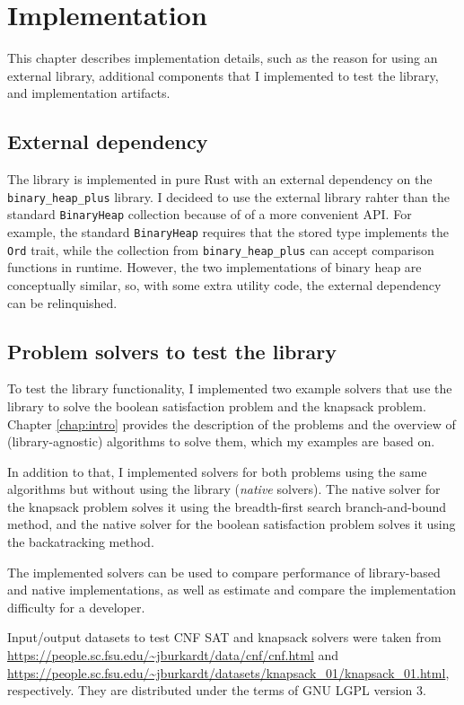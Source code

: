 \chapter{Implementation}
\label{chap:impl}

This chapter describes implementation details, such as the reason for using an external library,
additional components that I implemented to test the library, and implementation artifacts.

\section{External dependency}

The library is implemented in pure Rust with an external dependency on the
\texttt{binary\_heap\_plus} library. I decideed to use the external library rahter than the
standard \texttt{BinaryHeap} collection because of of a more convenient API. For example,
the standard \texttt{BinaryHeap} requires that the stored type implements the \texttt{Ord}
trait, while the collection from \texttt{binary\_heap\_plus} can accept comparison functions in
runtime. However, the two implementations of binary heap are conceptually similar, so, with some
extra utility code, the external dependency can be relinquished.

\section{Problem solvers to test the library}

To test the library functionality, I implemented two example solvers that use the library to
solve the boolean satisfaction problem and the knapsack problem. Chapter \ref{chap:intro}
provides the description of the problems and the overview of (library-agnostic)
algorithms to solve them, which my examples are based on.

In addition to that, I implemented solvers for both problems using the same algorithms
but without using the library (\emph{native} solvers).
The native solver for the knapsack problem solves it using the breadth-first search
branch-and-bound method, and the native solver for the boolean satisfaction problem solves it
using the backatracking method.

The implemented solvers can be used to compare performance of library-based and native
implementations, as well as estimate and compare the implementation difficulty for a developer.

Input/output datasets to test CNF SAT and knapsack solvers were taken from
\url{https://people.sc.fsu.edu/~jburkardt/data/cnf/cnf.html} and
\url{https://people.sc.fsu.edu/~jburkardt/datasets/knapsack_01/knapsack_01.html}, respectively.
They are distributed under the terms of GNU LGPL version 3.
